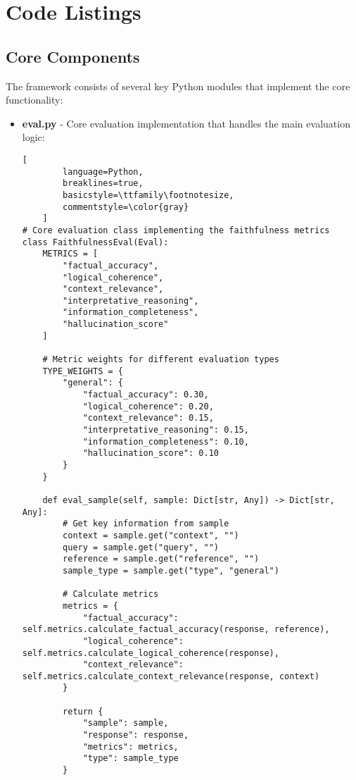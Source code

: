 \appendix
\section{Code Listings}

\subsection{Core Components}
The framework consists of several key Python modules that implement the core functionality:

\begin{itemize}
    \item \textbf{eval.py} - Core evaluation implementation that handles the main evaluation logic:
    \begin{lstlisting}[
        language=Python,
        breaklines=true,
        basicstyle=\ttfamily\footnotesize,
        commentstyle=\color{gray}
    ]
# Core evaluation class implementing the faithfulness metrics
class FaithfulnessEval(Eval):
    METRICS = [
        "factual_accuracy",
        "logical_coherence",
        "context_relevance",
        "interpretative_reasoning",
        "information_completeness",
        "hallucination_score"
    ]
    
    # Metric weights for different evaluation types
    TYPE_WEIGHTS = {
        "general": {
            "factual_accuracy": 0.30,
            "logical_coherence": 0.20,
            "context_relevance": 0.15,
            "interpretative_reasoning": 0.15,
            "information_completeness": 0.10,
            "hallucination_score": 0.10
        }
    }
    
    def eval_sample(self, sample: Dict[str, Any]) -> Dict[str, Any]:
        # Get key information from sample
        context = sample.get("context", "")
        query = sample.get("query", "")
        reference = sample.get("reference", "")
        sample_type = sample.get("type", "general")
        
        # Calculate metrics
        metrics = {
            "factual_accuracy": self.metrics.calculate_factual_accuracy(response, reference),
            "logical_coherence": self.metrics.calculate_logical_coherence(response),
            "context_relevance": self.metrics.calculate_context_relevance(response, context)
        }
        
        return {
            "sample": sample,
            "response": response,
            "metrics": metrics,
            "type": sample_type
        }
    \end{lstlisting}


\end{itemize}

